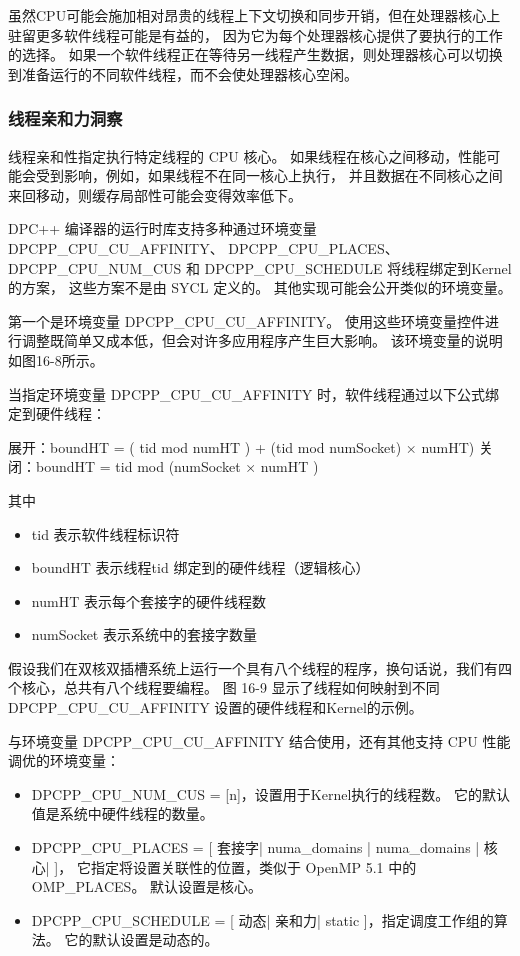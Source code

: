 虽然CPU可能会施加相对昂贵的线程上下文切换和同步开销，但在处理器核心上驻留更多软件线程可能是有益的，
因为它为每个处理器核心提供了要执行的工作的选择。 
如果一个软件线程正在等待另一线程产生数据，则处理器核心可以切换到准备运行的不同软件线程，而不会使处理器核心空闲。

\subsubsection{线程亲和力洞察}
线程亲和性指定执行特定线程的 CPU 核心。 
如果线程在核心之间移动，性能可能会受到影响，例如，如果线程不在同一核心上执行，
并且数据在不同核心之间来回移动，则缓存局部性可能会变得效率低下。

DPC++ 编译器的运行时库支持多种通过环境变量 DPCPP\_CPU\_CU\_AFFINITY、
DPCPP\_CPU\_PLACES、DPCPP\_CPU\_NUM\_CUS 和 DPCPP\_CPU\_SCHEDULE 将线程绑定到Kernel的方案，
这些方案不是由 SYCL 定义的。 
其他实现可能会公开类似的环境变量。

第一个是环境变量 DPCPP\_CPU\_CU\_AFFINITY。 
使用这些环境变量控件进行调整既简单又成本低，但会对许多应用程序产生巨大影响。 该环境变量的说明如图16-8所示。

当指定环境变量 DPCPP\_CPU\_CU\_AFFINITY 时，软件线程通过以下公式绑定到硬件线程：

展开：boundHT = ( tid mod numHT ) + (tid mod numSocket) × numHT) 关闭：boundHT = tid mod (numSocket × numHT )

其中

\begin{itemize}
	\item tid 表示软件线程标识符

	\item boundHT 表示线程tid 绑定到的硬件线程（逻辑核心）

	\item numHT 表示每个套接字的硬件线程数

	\item numSocket 表示系统中的套接字数量
\end{itemize}

假设我们在双核双插槽系统上运行一个具有八个线程的程序，换句话说，我们有四个核心，总共有八个线程要编程。 
图 16-9 显示了线程如何映射到不同 DPCPP\_CPU\_CU\_AFFINITY 设置的硬件线程和Kernel的示例。

与环境变量 DPCPP\_CPU\_CU\_AFFINITY 结合使用，还有其他支持 CPU 性能调优的环境变量：

\begin{itemize}
	\item DPCPP\_CPU\_NUM\_CUS = [n]，设置用于Kernel执行的线程数。 它的默认值是系统中硬件线程的数量。

	\item DPCPP\_CPU\_PLACES = [ 套接字| numa\_domains | numa\_domains | 核心| ]，
	它指定将设置关联性的位置，类似于 OpenMP 5.1 中的 OMP\_PLACES。 默认设置是核心。

	\item DPCPP\_CPU\_SCHEDULE = [ 动态| 亲和力| static ]，指定调度工作组的算法。 它的默认设置是动态的。
\end{itemize}

